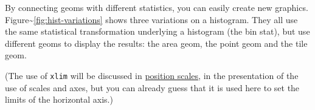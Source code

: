 
By connecting geoms with different statistics, you can easily create new
graphics. Figure\textasciitilde{}\ref{fig:hist-variations} shows three
variations on a histogram. They all use the same statistical
transformation underlying a histogram (the bin stat), but use different
geoms to display the results: the area geom, the point geom and the tile
geom. 

\begin{Shaded}
\begin{Highlighting}[]
\StringTok{ }\StringTok{ }\NormalTok{(}\NormalTok{, }\NormalTok{)}
\StringTok{ }\NormalTok{(}\NormalTok{(}  \NormalTok{, } \NormalTok{)}
\StringTok{ }\NormalTok{(}
  \NormalTok{(}  \NormalTok{, }
   \NormalTok{, }
\NormalTok{)}
\StringTok{ }\NormalTok{(}
  \NormalTok{(} \NormalTok{, }  \NormalTok{, }
   \NormalTok{, }
\NormalTok{)}
\end{Highlighting}
\end{Shaded}

(The use of \texttt{xlim} will be discussed in
\hyperref[sub:scale-position]{position scales}, in the presentation of
the use of scales and axes, but you can already guess that it is used
here to set the limits of the horizontal axis.)

